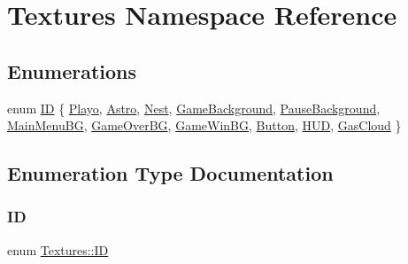 \hypertarget{namespace_textures}{}\section{Textures Namespace Reference}
\label{namespace_textures}
\subsection*{Enumerations}
\begin{DoxyCompactItemize}
\item 
enum \hyperlink{namespace_textures_a2cfe2099537d4e80b08437b4978301a5}{ID} \{ \newline
\hyperlink{namespace_textures_a2cfe2099537d4e80b08437b4978301a5aa7eca1b35d39c70635eb67e8d21dc819}{Playo}, 
\hyperlink{namespace_textures_a2cfe2099537d4e80b08437b4978301a5a61cbf1132258cda586a6130a03e804c9}{Astro}, 
\hyperlink{namespace_textures_a2cfe2099537d4e80b08437b4978301a5ae0de724966274dc241ef3de7eadc396d}{Nest}, 
\hyperlink{namespace_textures_a2cfe2099537d4e80b08437b4978301a5a52aa97e3cdb226168982426b7ab0aa2d}{Game\+Background}, 
\newline
\hyperlink{namespace_textures_a2cfe2099537d4e80b08437b4978301a5aa39a5e3bca9832daaaa9cbf31b8961f9}{Pause\+Background}, 
\hyperlink{namespace_textures_a2cfe2099537d4e80b08437b4978301a5aa7d0eb38e6c55469c163efe01cb88695}{Main\+Menu\+BG}, 
\hyperlink{namespace_textures_a2cfe2099537d4e80b08437b4978301a5a24f167674de87c1108c92fffd3837cd0}{Game\+Over\+BG}, 
\hyperlink{namespace_textures_a2cfe2099537d4e80b08437b4978301a5aee47421f6d61f9f5c50d07424097fa99}{Game\+Win\+BG}, 
\newline
\hyperlink{namespace_textures_a2cfe2099537d4e80b08437b4978301a5ac583013e9c40cfacce00147270928966}{Button}, 
\hyperlink{namespace_textures_a2cfe2099537d4e80b08437b4978301a5a34760cfde35030b2a2e35c8e81d6602a}{H\+UD}, 
\hyperlink{namespace_textures_a2cfe2099537d4e80b08437b4978301a5aa9db10d857958d53d192c3165dead752}{Gas\+Cloud}
 \}
\end{DoxyCompactItemize}


\subsection{Enumeration Type Documentation}
\mbox{\label{namespace_textures_a2cfe2099537d4e80b08437b4978301a5}} 
\subsubsection{\texorpdfstring{ID}{ID}}
{\footnotesize\ttfamily enum \hyperlink{namespace_textures_a2cfe2099537d4e80b08437b4978301a5}{Textures\+::\+ID}}

